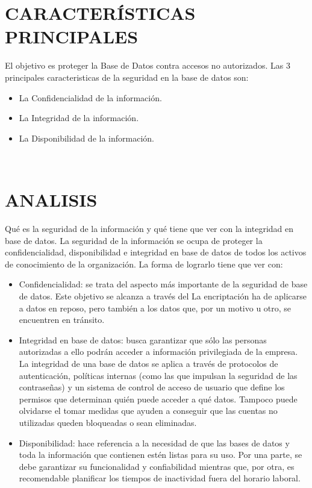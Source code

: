 \documentclass[conference]{IEEEtran}
\begin{document}
\section{CARACTERÍSTICAS PRINCIPALES}
El objetivo es proteger la Base de Datos contra
accesos no autorizados.
Las 3 principales caracteristicas de la seguridad en la base de datos son:
\begin{itemize}
\item \textbf{}La Confidencialidad de la información.
\item \textbf{}La Integridad de la información.
\item \textbf{}La Disponibilidad de la información.
\end{itemize}
\\

\section{ANALISIS}
Qué es la seguridad de la información y qué tiene que ver con la integridad en base de datos.
La seguridad de la información se ocupa de proteger la confidencialidad, disponibilidad e integridad en base de datos de todos los activos de conocimiento de la organización. La forma de lograrlo tiene que ver con:
\begin{itemize}
\item \textbf{}Confidencialidad: se trata del aspecto más importante de la seguridad de base de datos. Este objetivo se alcanza a través del La encriptación ha de aplicarse a datos en reposo, pero también a los datos que, por un motivo u otro, se encuentren en tránsito.
\item \textbf{}Integridad en base de datos: busca garantizar que sólo las personas autorizadas a ello podrán acceder a información privilegiada de la empresa. La integridad de una base de datos se aplica a través de protocolos de autenticación, políticas internas (como las que impulsan la seguridad de las contraseñas) y un sistema de control de acceso de usuario que define los permisos que determinan quién puede acceder a qué datos. Tampoco puede olvidarse el tomar medidas que ayuden a conseguir que las cuentas no utilizadas queden bloqueadas o sean eliminadas.
\item \textbf{}Disponibilidad: hace referencia a la necesidad de que las bases de datos y toda la información que contienen estén listas para su uso. Por una parte, se debe garantizar su funcionalidad y confiabilidad mientras que, por otra, es recomendable planificar los tiempos de inactividad fuera del horario laboral.
\end{itemize}
\\
\end{document}
